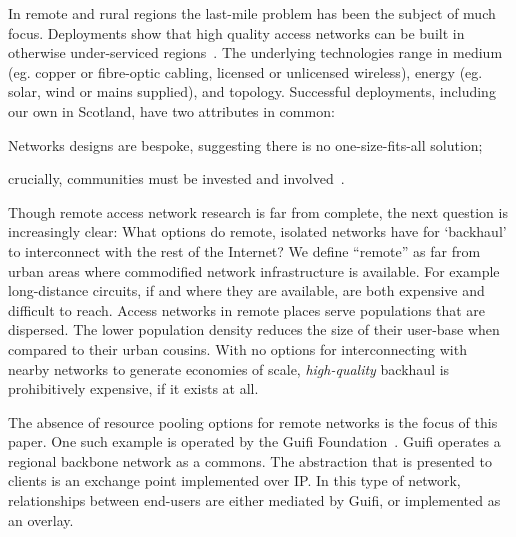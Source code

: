In remote and rural regions the last-mile problem has been the subject
of much focus. Deployments
show that high quality access networks can be built
in otherwise under-serviced regions~\cite{guifi, tegola,Hasan:2015}.
The underlying technologies range in medium (eg. copper or
fibre-optic cabling, licensed or unlicensed wireless), energy (eg.
solar, wind %
or mains supplied), and topology.
Successful deployments, including our own in Scotland,
have two attributes in common:
\begin{inparaenum}[(i)]
  \item Networks designs are bespoke, suggesting
    there is no one-size-fits-all solution;
  \item crucially, communities must be invested and
    involved~\cite{Wallace:2015a}.%
\end{inparaenum}

Though remote access network research is far from complete, the next
question is increasingly clear: What options do remote, isolated
networks have for `backhaul' to interconnect with the rest of the
Internet? We define ``remote'' as far from urban areas where
commodified network infrastructure is available. For example
long-distance circuits, if and where they are available, are both
expensive and difficult to reach. Access networks in remote places
serve populations that are dispersed. The lower population density
reduces the size of their user-base when compared to their urban
cousins. With no options for interconnecting with nearby networks to
generate economies of scale, \emph{high-quality} backhaul is
prohibitively expensive, if it exists at all.


The absence of resource pooling options for remote networks is the focus of this
paper. One such example is operated by the Guifi Foundation~\cite{guifi}. Guifi
operates a regional backbone network as a commons. The abstraction that is
presented to clients is an exchange point implemented over IP. In this type of
network, relationships between end-users are either mediated by Guifi, or
implemented as an overlay.

